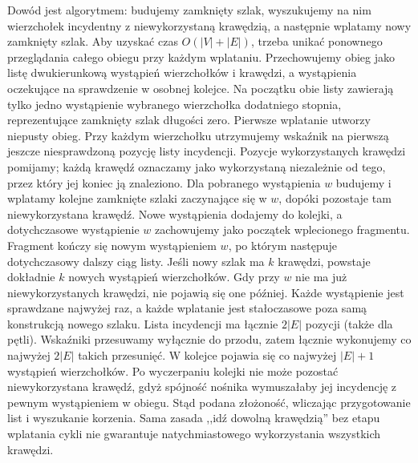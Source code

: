 \begin{uwaga}
Dowód jest algorytmem: budujemy zamknięty szlak, wyszukujemy
na nim wierzchołek incydentny z niewykorzystaną krawędzią,
a następnie wplatamy nowy zamknięty szlak. Aby uzyskać czas $O(|V|+|E|)$, trzeba unikać ponownego
przeglądania całego obiegu przy każdym wplataniu.
Przechowujemy obieg jako listę dwukierunkową wystąpień
wierzchołków i krawędzi, a wystąpienia oczekujące na
sprawdzenie w osobnej kolejce. Na początku obie listy
zawierają tylko jedno wystąpienie wybranego wierzchołka
dodatniego stopnia, reprezentujące zamknięty szlak
długości zero. Pierwsze wplatanie utworzy niepusty obieg. Przy każdym wierzchołku
utrzymujemy wskaźnik na pierwszą jeszcze niesprawdzoną
pozycję listy incydencji. Pozycje wykorzystanych krawędzi
pomijamy; każdą krawędź oznaczamy jako wykorzystaną
niezależnie od tego, przez który jej koniec ją znaleziono.
Dla pobranego wystąpienia $w$ budujemy i wplatamy kolejne
zamknięte szlaki zaczynające się w $w$, dopóki pozostaje
tam niewykorzystana krawędź. Nowe wystąpienia dodajemy
do kolejki, a dotychczasowe wystąpienie $w$ zachowujemy
jako początek wplecionego fragmentu. Fragment kończy
się nowym wystąpieniem $w$, po którym następuje
dotychczasowy dalszy ciąg listy. Jeśli nowy szlak ma
$k$ krawędzi, powstaje dokładnie $k$ nowych wystąpień
wierzchołków. Gdy przy $w$ nie ma już niewykorzystanych
krawędzi, nie pojawią się one później. Każde wystąpienie
jest sprawdzane najwyżej raz, a każde wplatanie jest
stałoczasowe poza samą konstrukcją nowego szlaku.
Lista incydencji ma łącznie $2|E|$ pozycji (także dla
pętli). Wskaźniki przesuwamy wyłącznie do przodu,
zatem łącznie wykonujemy co najwyżej $2|E|$ takich
przesunięć. W kolejce pojawia się co najwyżej
$|E|+1$ wystąpień wierzchołków. Po wyczerpaniu
kolejki nie może pozostać niewykorzystana krawędź,
gdyż spójność nośnika wymuszałaby jej incydencję
z pewnym wystąpieniem w obiegu. Stąd podana złożoność,
wliczając przygotowanie list i wyszukanie korzenia. Sama zasada ,,idź dowolną krawędzią''
bez etapu wplatania cykli nie gwarantuje natychmiastowego
wykorzystania wszystkich krawędzi.
\end{uwaga}

